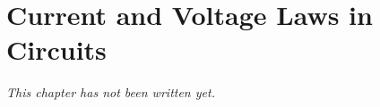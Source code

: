 \chapter{Current and Voltage Laws in Circuits}\label{ch:g8:circuit-laws}


\emph{This chapter has not been written yet.}
